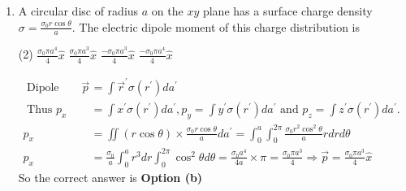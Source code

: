 \begin{enumerate}
\begin{answer}
\end{answer}
\item  A circular disc of radius $a$ on the $x y$ plane has a surface charge density $\sigma=\frac{\sigma_{0} r \cos \theta}{a}$. The electric dipole moment of this charge distribution is
 \begin{tasks}(2)
	\task[\textbf{a.}] $\frac{\sigma_{0} \pi a^{4}}{4} \hat{x}$
	\task[\textbf{b.}]$\frac{\sigma_{0} \pi a^{3}}{4} \hat{x}$
	\task[\textbf{c.}] $\frac{-\sigma_{0} \pi a^{3}}{4} \hat{x}$
	\task[\textbf{d.}]$\frac{-\sigma_{0} \pi a^{4}}{4} \hat{x}$ 
\end{tasks}
\begin{answer}
	$$
	\begin{aligned}
	\text { Dipole moment } \vec{p}&=\int \vec{r}^{\prime} \sigma\left(r^{\prime}\right) d a^{\prime}\\
	\text { Thus } p_{x}&=\int x^{\prime} \sigma\left(r^{\prime}\right) d a^{\prime}, p_{y}=\int y^{\prime} \sigma\left(r^{\prime}\right) d a^{\prime} \text { and } p_{z}=\int z^{\prime} \sigma\left(r^{\prime}\right) d a^{\prime} \text {. }\\
	p_{x}&=\iint(r \cos \theta) \times \frac{\sigma_{0} r \cos \theta}{a} d a^{\prime}=\int_{0}^{a} \int_{0}^{2 \pi} \frac{\sigma_{0} r^{2} \cos ^{2} \theta}{a} r d r d \theta\\
	p_{x}&=\frac{\sigma_{0}}{a} \int_{0}^{a} r^{3} d r \int_{0}^{2 \pi} \cos ^{2} \theta d \theta=\frac{\sigma_{0} a^{4}}{4 a} \times \pi=\frac{\sigma_{0} \pi a^{3}}{4} \Rightarrow \vec{p}=\frac{\sigma_{0} \pi a^{3}}{4} \hat{x}
\end{aligned}
$$
So the correct answer is \textbf{Option (b)}
\end{answer}


\end{enumerate}